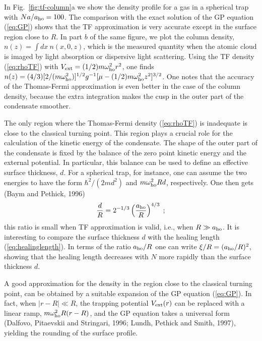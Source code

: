 In  Fig.~\ref{fig:tf-column}a we show the density profile for a
gas in a spherical trap with  $N a / a_{\rm ho} =  100$. The comparison 
with the exact solution of the GP equation (\ref{eq:GP}) shows that the
TF approximation is very accurate except in the surface region close 
to $R$. In part $b$ of the same figure, we plot the column density,
$n(z) = \int dx \ n (x,0,z)$, which is the measured quantity when 
the atomic cloud is imaged by light absorption or dispersive light
scattering.  Using the TF density (\ref{eq:rhoTF}) with 
$V_{\rm ext}=(1/2)m\omega_{\rm ho}^2 r^2$, 
one  finds  $n(z) = (4/3)  [2/(m\omega_{\rm ho}^2)]^{1/2} g^{-1}
[\mu-(1/2)m\omega_{\rm ho}^2 z^2]^{3/2}$. One notes that the accuracy of the 
Thomas-Fermi approximation is even better in the case of the column 
density, because the extra integration makes the cusp in the outer 
part of the condensate smoother. 

The only region where the Thomas-Fermi density (\ref{eq:rhoTF})
is inadequate is close to the classical turning point. This
region plays a crucial role for the calculation of the kinetic energy
of the condensate. The shape of the outer part of the condensate
is fixed by the balance of the zero point kinetic energy and the
external potential. In particular, this balance can be used to define
an effective surface thickness, $d$. For a spherical trap, for
instance, one can assume the two energies  to have the form
$\hbar^2/(2md^2)$ and $m\omega_{\rm ho}^2 Rd$, respectively. One then
gets (Baym and Pethick, 1996)
\begin{equation}
{ d \over R} 
= 2^{-1/3} \left( {a_{\rm ho} \over R} \right)^{4/3}  \; ;
\label{eq:surfacethickness}
\end{equation}
this ratio is small when TF approximation is valid, i.e., when
$R \gg a_{\rm ho}$. It is interesting to compare the surface thickness $d$ 
with the healing length (\ref{eq:healinglength}). In terms of the ratio 
$a_{\rm ho}/R$ one can write $\xi/R=(a_{\rm ho}/R)^2$, 
showing that the healing length decreases with $N$ more rapidly than 
the surface thickness $d$.  

A good approximation for the density in the region close to the classical 
turning point, can be obtained by a suitable
expansion of the GP equation (\ref{eq:GP}). In fact, when $|r-R|\ll R$, 
the trapping potential $V_{\rm ext}(r)$ can be replaced with a linear ramp,
$m \omega_{\rm ho}^2 R (r-R)$, and the GP equation takes a universal form
(Dalfovo, Pitaevskii and Stringari, 1996; Lundh, Pethick and 
Smith, 1997),  yielding the rounding of
the surface profile. 

